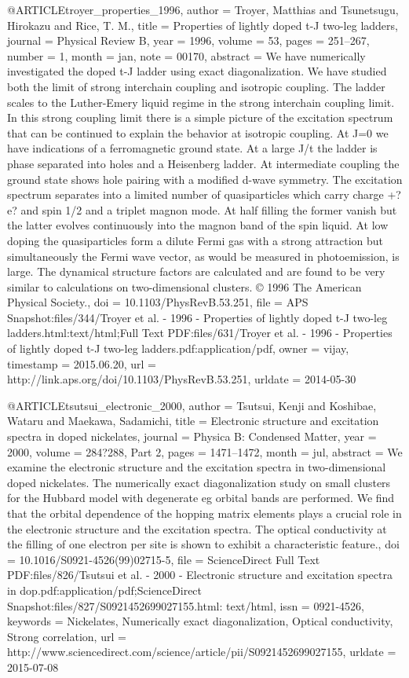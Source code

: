 @ARTICLE{troyer_properties_1996,
  author = {Troyer, Matthias and Tsunetsugu, Hirokazu and Rice, T. M.},
  title = {Properties of lightly doped t-{J} two-leg ladders},
  journal = {Physical Review B},
  year = {1996},
  volume = {53},
  pages = {251--267},
  number = {1},
  month = jan,
  note = {00170},
  abstract = {We have numerically investigated the doped t-J ladder using exact
	diagonalization. We have studied both the limit of strong interchain
	coupling and isotropic coupling. The ladder scales to the Luther-Emery
	liquid regime in the strong interchain coupling limit. In this strong
	coupling limit there is a simple picture of the excitation spectrum
	that can be continued to explain the behavior at isotropic coupling.
	At J=0 we have indications of a ferromagnetic ground state. At a
	large J/t the ladder is phase separated into holes and a Heisenberg
	ladder. At intermediate coupling the ground state shows hole pairing
	with a modified d-wave symmetry. The excitation spectrum separates
	into a limited number of quasiparticles which carry charge +?e? and
	spin 1/2 and a triplet magnon mode. At half filling the former vanish
	but the latter evolves continuously into the magnon band of the spin
	liquid. At low doping the quasiparticles form a dilute Fermi gas
	with a strong attraction but simultaneously the Fermi wave vector,
	as would be measured in photoemission, is large. The dynamical structure
	factors are calculated and are found to be very similar to calculations
	on two-dimensional clusters. © 1996 The American Physical Society.},
  doi = {10.1103/PhysRevB.53.251},
  file = {APS Snapshot:files/344/Troyer et al. - 1996 - Properties of lightly doped t-J two-leg ladders.html:text/html;Full Text PDF:files/631/Troyer et al. - 1996 - Properties of lightly doped t-J two-leg ladders.pdf:application/pdf},
  owner = {vijay},
  timestamp = {2015.06.20},
  url = {http://link.aps.org/doi/10.1103/PhysRevB.53.251},
  urldate = {2014-05-30}
}

@ARTICLE{tsutsui_electronic_2000,
  author = {Tsutsui, Kenji and Koshibae, Wataru and Maekawa, Sadamichi},
  title = {Electronic structure and excitation spectra in doped nickelates},
  journal = {Physica B: Condensed Matter},
  year = {2000},
  volume = {284?288, Part 2},
  pages = {1471--1472},
  month = jul,
  abstract = {We examine the electronic structure and the excitation spectra in
	two-dimensional doped nickelates. The numerically exact diagonalization
	study on small clusters for the Hubbard model with degenerate eg
	orbital bands are performed. We find that the orbital dependence
	of the hopping matrix elements plays a crucial role in the electronic
	structure and the excitation spectra. The optical conductivity at
	the filling of one electron per site is shown to exhibit a characteristic
	feature.},
  doi = {10.1016/S0921-4526(99)02715-5},
  file = {ScienceDirect Full Text PDF:files/826/Tsutsui et al. - 2000 - Electronic structure and         excitation spectra in dop.pdf:application/pdf;ScienceDirect Snapshot:files/827/S0921452699027155.html:    text/html},
  issn = {0921-4526},
  keywords = {Nickelates, Numerically exact diagonalization, Optical conductivity,
	Strong correlation},
  url = {http://www.sciencedirect.com/science/article/pii/S0921452699027155},
  urldate = {2015-07-08}
}

